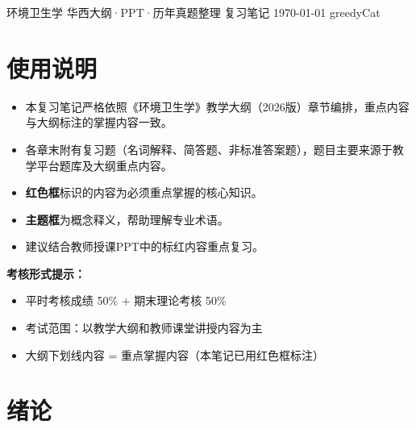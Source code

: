 \documentclass[10pt,a4paper,oneside]{ctexbook}
\begin{document}
\makecover
  {环境卫生学}       
  {华西大纲·PPT·历年真题整理}    
  {复习笔记}                  
  {\today}                 
  {greedyCat}                  

\tableofcontents

\chapter*{使用说明}

\begin{itemize}[leftmargin=*]
    \item 本复习笔记严格依照《环境卫生学》教学大纲（2026版）章节编排，重点内容与大纲标注的掌握内容一致。
    \item 各章末附有复习题（名词解释、简答题、非标准答案题），题目主要来源于教学平台题库及大纲重点内容。
    \item \textbf{\color{keyred}红色框}标识的内容为必须重点掌握的核心知识。
    \item \textbf{\color{main}主题框}为概念释义，帮助理解专业术语。
    \item 建议结合教师授课PPT中的标红内容重点复习。
\end{itemize}

\vspace{1cm}
\begin{center}
\begin{tcolorbox}[colback=yellow!10, colframe=yellow!80!black, boxrule=0.8pt, arc=6pt, width=0.85\textwidth, breakable]
\textbf{考核形式提示：}
\begin{itemize}[leftmargin=*]
    \item 平时考核成绩 50\% + 期末理论考核 50\%
    \item 考试范围：以教学大纲和教师课堂讲授内容为主
    \item 大纲下划线内容 = 重点掌握内容（本笔记已用红色框标注）
\end{itemize}
\end{tcolorbox}
\end{center}

\newpage

\chapter{绪论}
\setcounter{chapter}{1}
\end{document}
